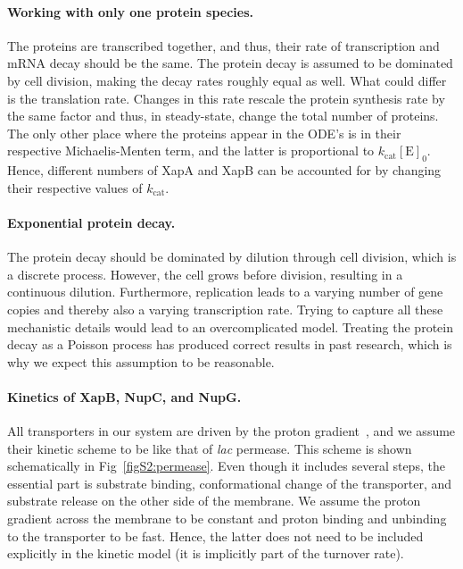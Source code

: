 \documentclass[10pt,letterpaper]{article}
\newcommand{\n}[1]{\mathrm{#1}}
\begin{document}
\paragraph*{Working with only one protein species.}
The proteins are transcribed together, and thus, their rate of transcription
and mRNA decay should be the same. The protein decay is assumed to be
dominated by cell division, making the decay rates roughly equal as well.
What could differ is the translation rate. Changes in this rate rescale the
protein synthesis rate by the same factor and thus, in steady-state, change
the total number of proteins. The only other place where the proteins appear
in the ODE's is in their respective Michaelis-Menten term, and the latter is
proportional to $k_{\n{cat}} \n{[E]_0}$. Hence, different numbers of XapA
and XapB can be accounted for by changing their respective values of
$k_{\n{cat}}$.

\paragraph*{Exponential protein decay.}
The protein decay should be dominated by dilution through cell division,
which is a discrete process. However, the cell grows before division,
resulting in a continuous dilution. Furthermore, replication leads to a
varying number of gene copies and thereby also a varying transcription rate.
Trying to capture all these mechanistic details would lead to an
overcomplicated model. Treating the protein decay as a Poisson process has
produced correct results in past research, which is why we expect this
assumption to be reasonable. 

\paragraph*{Kinetics of XapB, NupC, and NupG.}
All transporters in our system are driven by the proton
gradient~\cite{Norholm2001}, and we assume their kinetic scheme to be like
that of \emph{lac} permease. This scheme is shown schematically in
Fig~\ref{figS2:permease}. Even though it includes several steps, the
essential part is substrate binding, conformational change of the
transporter, and substrate release on the other side of the membrane. We
assume the proton gradient across the membrane to be constant and proton
binding and unbinding to the transporter to be fast. Hence, the latter does
not need to be included explicitly in the kinetic model (it is implicitly
part of the turnover rate). 
\end{document}
